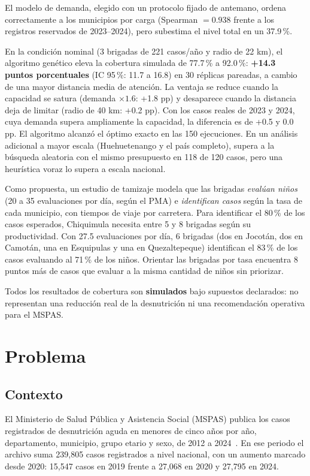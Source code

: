 \documentclass[11pt,letterpaper]{article}
\begin{document}
El modelo de demanda, elegido con un protocolo fijado de antemano, ordena correctamente a los municipios por carga (Spearman $=0.938$ frente a los registros reservados de 2023--2024), pero subestima el nivel total en un 37.9\,\%.

En la condición nominal (3 brigadas de 221 casos/año y radio de 22 km), el algoritmo genético eleva la cobertura simulada de 77.7\,\% a 92.0\,\%: \textbf{+14.3 puntos porcentuales} (IC 95\,\%: 11.7 a 16.8) en 30 réplicas pareadas, a cambio de una mayor distancia media de atención. La ventaja se reduce cuando la capacidad se satura (demanda $\times1.6$: +1.8 pp) y desaparece cuando la distancia deja de limitar (radio de 40 km: +0.2 pp). Con los casos reales de 2023 y 2024, cuya demanda supera ampliamente la capacidad, la diferencia es de +0.5 y 0.0 pp. El algoritmo alcanzó el óptimo exacto en las 150 ejecuciones. En un análisis adicional a mayor escala (Huehuetenango y el país completo), supera a la búsqueda aleatoria con el mismo presupuesto en 118 de 120 casos, pero una heurística voraz lo supera a escala nacional.

Como propuesta, un estudio de tamizaje modela que las brigadas \emph{evalúan niños} (20 a 35 evaluaciones por día, según el PMA) e \emph{identifican casos} según la tasa de cada municipio, con tiempos de viaje por carretera. Para identificar el 80\,\% de los casos esperados, Chiquimula necesita entre 5 y 8 brigadas según su productividad. Con 27.5 evaluaciones por día, 6 brigadas (dos en Jocotán, dos en Camotán, una en Esquipulas y una en Quezaltepeque) identifican el 83\,\% de los casos evaluando al 71\,\% de los niños. Orientar las brigadas por tasa encuentra 8 puntos más de casos que evaluar a la misma cantidad de niños sin priorizar.

Todos los resultados de cobertura son \textbf{simulados} bajo supuestos declarados: no representan una reducción real de la desnutrición ni una recomendación operativa para el MSPAS.

\section{Problema}
\label{sec:problema}

\subsection{Contexto}

El Ministerio de Salud Pública y Asistencia Social (MSPAS) publica los casos registrados de desnutrición aguda en menores de cinco años por año, departamento, municipio, grupo etario y sexo, de 2012 a 2024~\cite{mspas}. En ese periodo el archivo suma 239{,}805 casos registrados a nivel nacional, con un aumento marcado desde 2020: 15{,}547 casos en 2019 frente a 27{,}068 en 2020 y 27{,}795 en 2024.
\end{document}
